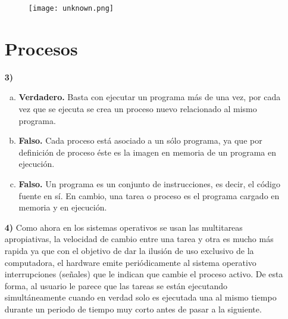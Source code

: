 \documentclass[11pt]{article}
\begin{document}
\begin{enumerate}[1)]
\begin{figure}[h!]
    \begin{center}
      \texttt{[image: unknown.png]}
    \end{center}
  \end{figure}
    \section*{Procesos}
    \item[\textbf{3)}]   
      \begin{enumerate}[(a)]
        \item \textbf{Verdadero.} Basta con ejecutar un programa más de una vez,
              por cada vez que se ejecuta se crea un proceso nuevo relacionado
              al mismo programa.
        \item \textbf{Falso.} Cada proceso está asociado a un sólo programa, ya que
              por definición de proceso éste es la imagen en memoria de un programa
              en ejecución.
        \item \textbf{Falso.} Un programa es un conjunto de instrucciones, es decir,
              el código fuente en sí. En cambio, una tarea o proceso es el programa
              cargado en memoria y en ejecución.
      \end{enumerate}
    \item[\textbf{4)}]
    Como ahora en los sistemas operativos se usan las multitareas apropiativas, la velocidad
    de cambio entre una tarea y otra es mucho más rapida ya que con el objetivo de dar la
    ilusión de uso exclusivo de la computadora, el hardware emite periódicamente al sistema
    operativo interrupciones (señales) que le indican que cambie el proceso activo.
    De esta forma, al usuario le parece que las tareas se están ejecutando simultáneamente
    cuando en verdad solo es ejecutada una al mismo tiempo durante un periodo
    de tiempo muy corto antes de pasar a la siguiente.
\end{enumerate}
\end{document}
